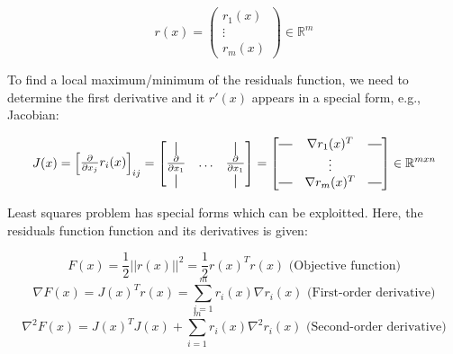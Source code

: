 \documentclass[a4paper]{report}
\numberwithin{figure}{section}
\newcommand{\R}{\mathbb{R}}
\newcommand*{\vertbar}{\rule[-1ex]{0.5pt}{2.5ex}}
\newcommand*{\horzbar}{\rule[.5ex]{2.5ex}{0.5pt}}
\begin{document}
\begin{equation}
  r(x) = \begin{pmatrix} r_1(x) \\ \vdots \\ r_m(x) \end{pmatrix} \in \R^m
\end{equation}

To find a local maximum/minimum of the residuals function, we need to 
determine the first derivative and it 
$r'(x)$ appears in a special form, e.g., Jacobian:

\begin{equation}
  J(x) = \begin{bmatrix} \frac{\partial}{\partial x_j }r_i(x) \end{bmatrix}_{ij} 
  = 
  \begin{bmatrix} 
    \vertbar & & \vertbar \\
    \frac{\partial}{\partial x_1} & \dots & \frac{\partial}{\partial x_1} \\
    \vertbar & & \vertbar
  \end{bmatrix}
  = 
  \begin{bmatrix}
    \horzbar & \nabla r_1(x)^T & \horzbar \\
     & \vdots & \\
    \horzbar & \nabla r_m(x)^T & \horzbar 
  \end{bmatrix}
  \in \R^{mxn}
\end{equation}

Least squares problem has special forms which can be exploitted. 
Here, the residuals function function and its derivatives is given:

\begin{equation}
  F(x) = \frac{1}{2} ||r(x)||^2 = \frac{1}{2} r(x)^T r(x) \text{  (Objective function)}
\end{equation}\label{eq:residuals_objective}
\begin{equation}
  \nabla F(x) = J(x)^T r(x) = \sum_{i=1}^{m} r_i(x) \nabla r_i(x) \text{  (First-order derivative)}
\end{equation}\label{eq:residuals_objective_first_der}
\begin{equation}
\nabla^2 F(x) = J(x)^TJ(x) + \sum_{i=1}^m r_i(x) \nabla^2 r_i(x) \text{ (Second-order derivative)}
\end{equation}\label{eq:residuals_objective_second_der}
\end{document}
